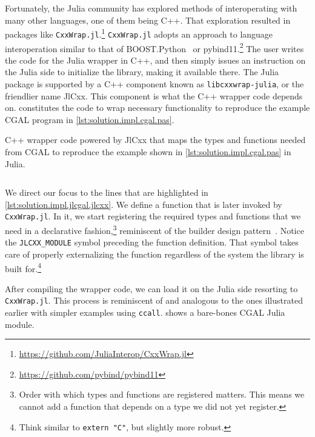 Fortunately, the Julia community has explored methods of interoperating with
many other languages, one of them being C++.  That exploration resulted in
packages like 
\texttt{CxxWrap.jl}.\footnote{\url{https://github.com/JuliaInterop/CxxWrap.jl}}
\texttt{CxxWrap.jl} adopts an approach to language interoperation similar to
that of BOOST.Python~\cite{Abrahams:2003:BHSBP} or
pybind11.\footnote{\url{https://github.com/pybind/pybind11}}  The user writes
the code for the Julia wrapper in C++, and then simply issues an instruction on
the Julia side to initialize the library, making it available there.  The Julia
package is supported by a C++ component known as \texttt{libcxxwrap-julia}, or
the friendlier name JlCxx. This component is what the C++ wrapper code depends
on.   constitutes the code to wrap
necessary functionality to reproduce the example \ac{CGAL} program in
\cref{lst:solution.impl.cgal.pas}.

\begin{listing}[htbp]
  \caption[Wrapper CxxWrap code for Three points and one segment]{
    C++ wrapper code powered by JlCxx that maps the types and functions needed
    from \acs{CGAL} to reproduce the example shown in
    \cref{lst:solution.impl.cgal.pas} in Julia.}%
  \label{lst:solution.impl.jlcgal.jlcxx}
  \inputminted[fontsize=\small,highlightlines={24,30-34,36-38,40-43,46-49}]%
    {cpp}{cpp/cgal_julia.cpp}
\end{listing}

We direct our focus to the lines that are highlighted in
\cref{lst:solution.impl.jlcgal.jlcxx}.  We define a function that is later
invoked by \texttt{CxxWrap.jl}.  In it, we start registering the required types
and functions that we need in a declarative fashion,\footnote{Order with which
types and functions are registered matters.  This means we cannot add a function
that depends on a type we did not yet register.} reminiscent of the builder
design pattern~\cite{GOF:1994:DPEROOS}.  Notice the \texttt{JLCXX\_MODULE}
symbol preceding the function definition.  That symbol takes care of properly
externalizing the function regardless of the system the library is built
for.\footnote{Think similar to \texttt{extern "C"}, but slightly more
robust.}

After compiling the wrapper code, we can load it on the Julia side resorting to
\texttt{CxxWrap.jl}.  This process is reminiscent of and analogous to the ones
illustrated earlier with simpler examples using \texttt{ccall}.
 shows a bare-bones CGAL Julia module.

